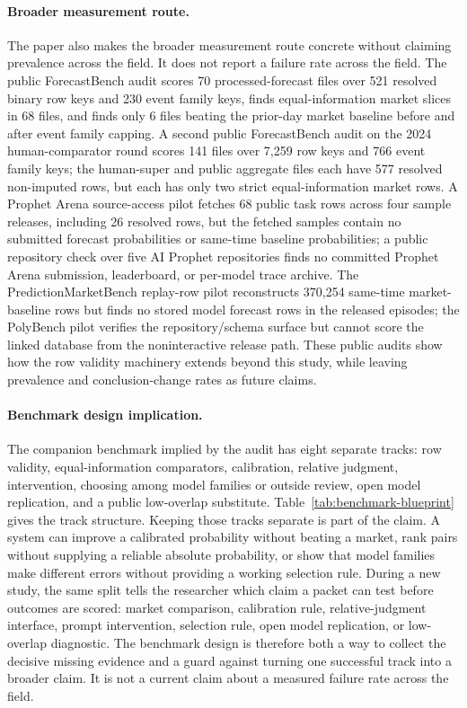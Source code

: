 \documentclass[11pt]{article}
\begin{document}
\paragraph{Broader measurement route.} The paper also makes the broader measurement route concrete without claiming prevalence across the field. It does not report a failure rate across the field. The public ForecastBench audit scores 70 processed-forecast files over 521 resolved binary row keys and 230 event family keys, finds equal-information market slices in 68 files, and finds only 6 files beating the prior-day market baseline before and after event family capping. A second public ForecastBench audit on the 2024 human-comparator round scores 141 files over 7{,}259 row keys and 766 event family keys; the human-super and public aggregate files each have 577 resolved non-imputed rows, but each has only two strict equal-information market rows. A Prophet Arena source-access pilot fetches 68 public task rows across four sample releases, including 26 resolved rows, but the fetched samples contain no submitted forecast probabilities or same-time baseline probabilities; a public repository check over five AI Prophet repositories finds no committed Prophet Arena submission, leaderboard, or per-model trace archive. The PredictionMarketBench replay-row pilot reconstructs 370{,}254 same-time market-baseline rows but finds no stored model forecast rows in the released episodes; the PolyBench pilot verifies the repository/schema surface but cannot score the linked database from the noninteractive release path. These public audits show how the row validity machinery extends beyond this study, while leaving prevalence and conclusion-change rates as future claims.

\paragraph{Benchmark design implication.} The companion benchmark implied by the audit has eight separate tracks: row validity, equal-information comparators, calibration, relative judgment, intervention, choosing among model families or outside review, open model replication, and a public low-overlap substitute. Table~\ref{tab:benchmark-blueprint} gives the track structure. Keeping those tracks separate is part of the claim. A system can improve a calibrated probability without beating a market, rank pairs without supplying a reliable absolute probability, or show that model families make different errors without providing a working selection rule. During a new study, the same split tells the researcher which claim a packet can test before outcomes are scored: market comparison, calibration rule, relative-judgment interface, prompt intervention, selection rule, open model replication, or low-overlap diagnostic. The benchmark design is therefore both a way to collect the decisive missing evidence and a guard against turning one successful track into a broader claim. It is not a current claim about a measured failure rate across the field.
\end{document}
